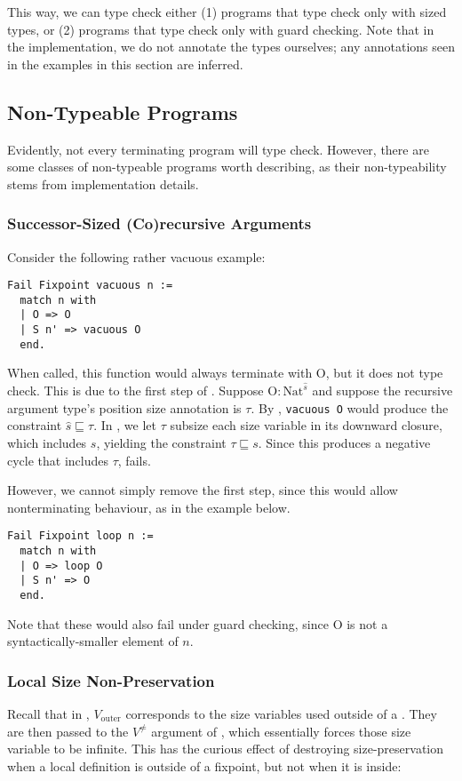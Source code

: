This way, we can type check either (1) programs that type check only with sized types, or (2) programs that type check only with guard checking.
Note that in the implementation, we do not annotate the types ourselves; any annotations seen in the examples in this section are inferred.

\subsection{Non-Typeable Programs}
Evidently, not every terminating program will type check.
However, there are some classes of non-typeable programs worth describing, as their non-typeability stems from implementation details.

\subsubsection{Successor-Sized (Co)recursive Arguments}
Consider the following rather vacuous example:

\begin{verbatim}
Fail Fixpoint vacuous n :=
  match n with
  | O => O
  | S n' => vacuous O
  end.
\end{verbatim}

When called, this function would always terminate with O, but it does not type check.
This is due to the first step of \RecCheck.
Suppose $\text{O}: \text{Nat}^{\hat{s}}$ and suppose the recursive argument type's position size annotation is $\tau$. 
By , \texttt{vacuous O} would produce the constraint $\hat{s} \sqsubseteq \tau$.
In \RecCheck, we let $\tau$ subsize each size variable in its downward closure, which includes $s$, yielding the constraint $\tau \sqsubseteq s$.
Since this produces a negative cycle that includes $\tau$, \RecCheck fails.

However, we cannot simply remove the first step, since this would allow nonterminating behaviour, as in the example below.

\begin{verbatim}
Fail Fixpoint loop n :=
  match n with
  | O => loop O
  | S n' => O
  end.
\end{verbatim}

Note that these would also fail under guard checking, since O is not a syntactically-smaller element of $n$.

\subsubsection{Local Size Non-Preservation}
Recall that in \RecCheckLoop, $V_{\text{outer}}$ corresponds to the size variables used outside of a \cofixpoint.
They are then passed to the $V^{\neq}$ argument of \RecCheck, which essentially forces those size variable to be infinite.
This has the curious effect of destroying size-preservation when a local definition is outside of a fixpoint, but not when it is inside:

